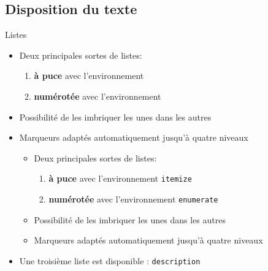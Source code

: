 \subsection{Disposition du texte}

\begin{frame}[fragile]{Listes}
	\begin{itemize}
		\item Deux principales sortes de listes:
		\begin{enumerate}
			\item \textbf{à puce} avec l'environnement 
			\item \textbf{numérotée} avec l'environnement 
		\end{enumerate}
		\item Possibilité de les imbriquer les unes dans les autres
		\item Marqueurs adaptés automatiquement jusqu'à quatre niveaux

		\pause
\begin{codesource}
	\begin{itemize}
		\item Deux principales sortes de listes:
		\begin{enumerate}
			\item \textbf{à puce} avec l'environnement \verb=itemize=
			\item \textbf{numérotée} avec l'environnement \verb=enumerate=
		\end{enumerate}
		\item Possibilité de les imbriquer les unes dans les autres
		\item Marqueurs adaptés automatiquement jusqu'à quatre niveaux
	\end{itemize}
\end{codesource}

		\pause
		\item Une troisième liste est disponible : \texttt{description}
	\end{itemize}
\end{frame}

